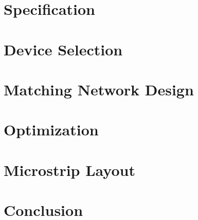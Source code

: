 \documentclass{article}
\begin{document}
\begin{titlepage}

\end{titlepage}
\section{Specification}

\section{Device Selection}

\section{Matching Network Design}

\section{Optimization}

\section{Microstrip Layout}

\section{Conclusion}

\end{document}
